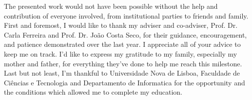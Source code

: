 
%

\begin{ntacknowledgements}
    The presented work would not have been possible without the help and contribution of everyone involved, from institutional parties to friends and family.
    First and foremost, I would like to thank my adviser and co-adviser, Prof. Dr. Carla Ferreira and Prof. Dr. João Costa Seco, for their guidance, encouragement, and patience demonstrated over the last year.
    I appreciate all of your advice to keep me on track.
    I'd like to express my gratitude to my family, especially my mother and father, for everything they've done to help me reach this milestone.
    Last but not least,  I’m thankful to Universidade Nova de Lisboa, Faculdade de Ciências e Tecnologia and Departamento de Informatica for the opportunity and the conditions which allowed me to complete my education.
\end{ntacknowledgements}